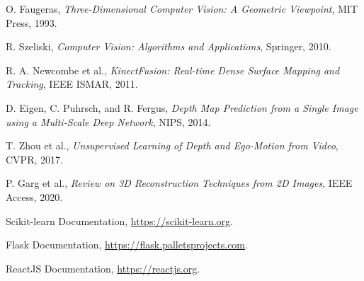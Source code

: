 \documentclass[conference]{IEEEtran}
\begin{document}
\begin{thebibliography}{10}

 O. Faugeras, \textit{Three-Dimensional Computer Vision: A Geometric Viewpoint}, MIT Press, 1993.

 R. Szeliski, \textit{Computer Vision: Algorithms and Applications}, Springer, 2010.

 R. A. Newcombe et al., \textit{KinectFusion: Real-time Dense Surface Mapping and Tracking}, IEEE ISMAR, 2011.

 D. Eigen, C. Puhrsch, and R. Fergus, \textit{Depth Map Prediction from a Single Image using a Multi-Scale Deep Network}, NIPS, 2014.

 T. Zhou et al., \textit{Unsupervised Learning of Depth and Ego-Motion from Video}, CVPR, 2017.

 P. Garg et al., \textit{Review on 3D Reconstruction Techniques from 2D Images}, IEEE Access, 2020.

 Scikit-learn Documentation, \url{https://scikit-learn.org}.

 Flask Documentation, \url{https://flask.palletsprojects.com}.

 ReactJS Documentation, \url{https://reactjs.org}.

\end{thebibliography}
\end{document}
